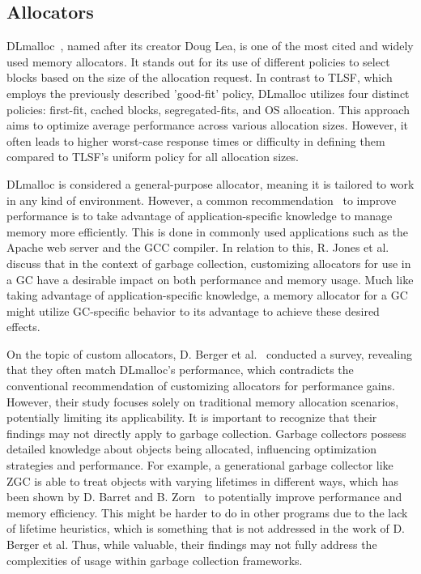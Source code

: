 

\subsection{Allocators}

DLmalloc~\cite{dlmalloc}, named after its creator Doug Lea, is one of the most cited and widely used memory allocators. It stands out for its use of different policies to select blocks based on the size of the allocation request. In contrast to TLSF, which employs the previously described 'good-fit' policy, DLmalloc utilizes four distinct policies: first-fit, cached blocks, segregated-fits, and OS allocation. This approach aims to optimize average performance across various allocation sizes. However, it often leads to higher worst-case response times or difficulty in defining them compared to TLSF's uniform policy for all allocation sizes.

DLmalloc is considered a general-purpose allocator, meaning it is tailored to work in any kind of environment. However, a common recommendation~\cite{custom_rec_1, custom_rec_2} to improve performance is to take advantage of application-specific knowledge to manage memory more efficiently. This is done in commonly used applications such as the Apache web server and the GCC compiler. In relation to this, R. Jones et al.~\cite{gchandbook} discuss that in the context of garbage collection, customizing allocators for use in a GC have a desirable impact on both performance and memory usage. Much like taking advantage of application-specific knowledge, a memory allocator for a GC might utilize GC-specific behavior to its advantage to achieve these desired effects.

On the topic of custom allocators, D. Berger et al.~\cite{slow_custom_allocators} conducted a survey, revealing that they often match DLmalloc's performance, which contradicts the conventional recommendation of customizing allocators for performance gains. However, their study focuses solely on traditional memory allocation scenarios, potentially limiting its applicability. It is important to recognize that their findings may not directly apply to garbage collection. Garbage collectors possess detailed knowledge about objects being allocated, influencing optimization strategies and performance. For example, a generational garbage collector like ZGC is able to treat objects with varying lifetimes in different ways, which has been shown by D. Barret and B. Zorn~\cite{lifetime_predictors_memalloc} to potentially improve performance and memory efficiency. This might be harder to do in other programs due to the lack of lifetime heuristics, which is something that is not addressed in the work of D. Berger et al. Thus, while valuable, their findings may not fully address the complexities of usage within garbage collection frameworks.


